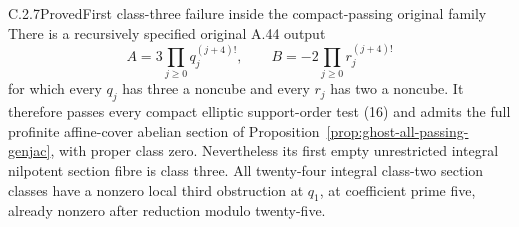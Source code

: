 \begin{result}{C.2.7}{Proved}{First class-three failure inside the compact-passing original family}
\label{thm:ghost-passing-first-class3}
There is a recursively specified original A.44 output
\[
 A=3\prod_{j\ge0}q_j^{(j+4)!},\qquad
 B=-2\prod_{j\ge0}r_j^{(j+4)!}
                                                        \tag{55}
\]
for which every \(q_j\) has three a noncube and
every \(r_j\) has two a noncube. It therefore
passes every compact elliptic support-order test
(16) and admits the full profinite affine-cover
abelian section of
Proposition~\ref{prop:ghost-all-passing-genjac},
with proper class zero. Nevertheless its first
empty unrestricted integral nilpotent section fibre
is class three. All twenty-four integral class-two
section classes have a nonzero local third
obstruction at \(q_1\), at coefficient prime five,
already nonzero after reduction modulo twenty-five.
\end{result}
